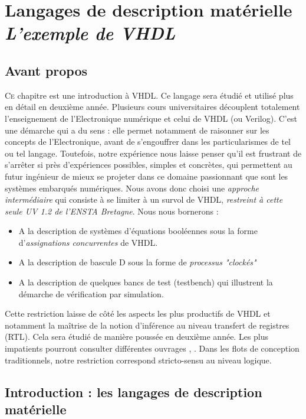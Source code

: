 \chapter[VHDL]{Langages de description matérielle\\{\it L'exemple de VHDL}}
\minitoc

\section{Avant propos}
\lettrine{C}e chapitre est une introduction à VHDL. Ce langage sera étudié et utilisé plus en détail en deuxième année. Plusieurs
cours universitaires découplent totalement l'enseignement de l'Electronique numérique et celui de VHDL (ou Verilog). C'est une
démarche qui a du sens : elle permet notamment de raisonner sur les concepts de l'Electronique, avant de s'engouffrer dans les
particularismes de tel ou tel langage. Toutefois, notre expérience nous laisse penser qu'il est frustrant de s'arrêter si près
d'expériences possibles, simples et concrètes, qui permettent au futur ingénieur de mieux se projeter dans ce domaine passionnant
que sont les systèmes embarqués numériques. Nous avons donc choisi une {\it approche intermédiaire} qui consiste à se limiter à un survol
de VHDL, {\it restreint à cette seule UV 1.2 de l'ENSTA Bretagne}. Nous nous bornerons :

\begin{itemize}
  \item A la description de systèmes d'équations booléennes sous la forme d'{\it assignations concurrentes} de VHDL.
  \item A la description de bascule D sous la forme de {\it processus "clockés"}
  \item A la description de quelques bancs de test (testbench) qui illustrent la démarche de vérification par simulation.
\end{itemize}

Cette restriction laisse de côté les aspects les plus productifs de VHDL et notamment la maîtrise de la notion d'inférence au niveau transfert
de registres (RTL). Cela sera étudié de manière poussée en deuxième année. Les plus impatients pourront consulter différentes ouvrages \cite{chu_rtl}, \cite{chu_fpga}.
Dans les flots de conception traditionnels, notre restriction correspond stricto-sensu au niveau logique.

\section{Introduction : les langages de description matérielle}

